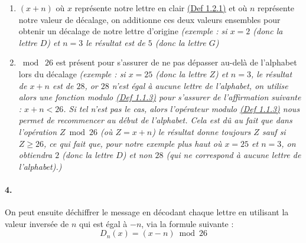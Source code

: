 \documentclass[
  paper=a4,
  ,captions=tableheading
]{scrartcl}
\begin{document}
\begin{enumerate}
\def\labelenumi{\arabic{enumi}.}
\item
  \((x+n)\) où \(x\) représente notre lettre en clair
  \hyperref[def-1.2.1]{(Def 1.2.1)} et où \(n\) représente notre valeur de décalage, on additionne
  ces deux valeurs ensembles pour obtenir un décalage de notre lettre
  d'origine \emph{(exemple : si \(x = 2\) (donc la lettre \(D\)) et
  \(n=3\) le résultat est de \(5\) (donc la lettre \(G\))}
\item
  \(\bmod \;26\) est présent pour s'assurer de ne pas dépasser au-delà
  de l'alphabet lors du décalage \emph{(exemple : si \(x=25\) (donc la
  lettre \(Z\)) et \(n=3\), le résultat de \(x+n\) est de \(28\), or
  \(28\) n'est égal à aucune lettre de l'alphabet, on utilise alors une
  fonction modulo
  \hyperref[def-1.1.3]{(Def 1.1.3)} pour s'assurer de l'affirmation suivante : \(x+n < 26\). Si
  tel n'est pas le cas, alors l'opérateur modulo
  \hyperref[def-1.1.3]{(Def 1.1.3)} nous permet de recommencer au début de l'alphabet. Cela est dû
  au fait que dans l'opération \(Z \bmod 26\) (où \(Z=x+n\)) le résultat
  donne toujours \(Z\) sauf si \(Z\geq26\), ce qui fait que, pour notre
  exemple plus haut où \(x=25\) et \(n=3\), on obtiendra \(2\) (donc la
  lettre \(D\)) et non \(28\) (qui ne correspond à aucune lettre de
  l'alphabet).)}
\end{enumerate}

\paragraph{4.}\label{section-2}

On peut ensuite déchiffrer le message en décodant chaque lettre en
utilisant la valeur inversée de \(n\) qui est égal à \(-n\), via la
formule suivante : \[
D_n(x)=(x-n) \bmod 26
\]
\end{document}
